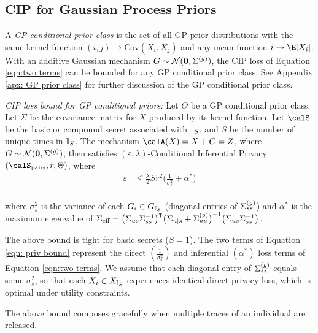 \subsection{CIP for Gaussian Process Priors}
\label{sec: CIP for GP} 
A \emph{GP conditional prior class} is the set of all GP prior distributions with the same kernel function $(i,j) \rightarrow \text{Cov}(X_i, X_j)$ and any mean function $i \rightarrow \E[X_i]$. With an additive Gaussian mechanism $G \sim \mathcal{N}(\mathbf{0}, \Sigma^{(g)})$, the CIP loss of Equation \eqref{eqn:two terms} can be bounded for any GP conditional prior class. See Appendix \ref{apx: GP prior class} for further discussion of the GP conditional prior class. 

\begin{theorem}\emph{CIP loss bound for GP conditional priors:}
\label{thm:GP bound}
	Let $\Theta$ be a GP conditional prior class. Let $\Sigma$ be the covariance matrix for $X$ produced by its kernel function. Let $\calS$ be the basic or compound secret associated with ${\mathbb{I}_S}$, and $S$ be the number of unique times in ${\mathbb{I}_S}$. The mechanism $\calA(X) = X + G = Z$, where $G \sim \mathcal{N}(\mathbf{0}, \Sigma^{(g)})$, then satisfies $(\varepsilon, \lambda)$-Conditional Inferential Privacy $(\Spairs, r, \Theta)$, where 
	\begin{align}
		\varepsilon
		&\leq \frac{\lambda}{2} S r^2 \Big(  \frac{1 }{\sigma_s^2} + \alpha^*  \Big) 
		\label{eqn: priv bound}
	\end{align}
	\text{ }\vspace{1mm}\\
	where $\sigma_s^2$ is the variance of each $G_i \in {G_{\mathbb{I}_S}}$ (diagonal entries of $\Sigma^{(g)}_{ss}$) and $\alpha^*$ is the maximum eigenvalue of $\Sigma_{\text{eff}} = \big(\Sigma_{us} \Sigma_{ss}^{-1}\big)^\intercal \big( \Sigma_{u | s} + \Sigma_{uu}^{(g)} \big)^{-1} \big(\Sigma_{us} \Sigma_{ss}^{-1}\big)$. 
\end{theorem}

The above bound is tight for basic secrets ($S = 1$). The two terms of Equation \eqref{eqn: priv bound} represent the direct $(\frac{1}{\sigma_s^2})$ and inferential $(\alpha^*)$ loss terms of Equation \eqref{eqn:two terms}. We assume that each diagonal entry of $\Sigma^{(g)}_{ss}$ equals some $\sigma_s^2$, so that each $X_i \in {X_{\mathbb{I}_S}}$ experiences identical direct privacy loss, which is optimal under utility constraints. 

The above bound composes gracefully when multiple traces of an individual are released. 

